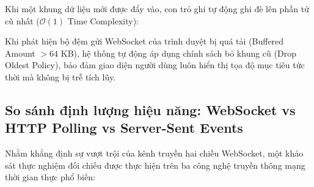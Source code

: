 Khi một khung dữ liệu mới được đẩy vào, con trỏ ghi tự động ghi đè lên phần tử cũ nhất ($\mathcal{O}(1)$ Time Complexity):

\begin{table}[H]
\centering
\caption{So sánh hiệu năng và độ ổn định bộ nhớ giữa các kiến trúc lưu trữ lịch sử khung}
\label{tab:ring-buffer-architecture-comparison}
\end{table}

Khi phát hiện bộ đệm gửi WebSocket của trình duyệt bị quá tải (Buffered Amount $> 64$ KB), hệ thống tự động áp dụng chính sách bỏ khung cũ (Drop Oldest Policy), bảo đảm giao diện người dùng luôn hiển thị tọa độ mục tiêu tức thời mà không bị trễ tích lũy.

\subsection{So sánh định lượng hiệu năng: WebSocket vs HTTP Polling vs Server-Sent Events}

\hspace{0.5cm} Nhằm khẳng định sự vượt trội của kênh truyền hai chiều WebSocket, một khảo sát thực nghiệm đối chiếu được thực hiện trên ba công nghệ truyền thông mạng thời gian thực phổ biến:

